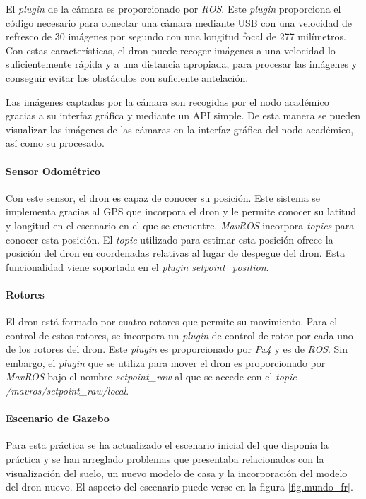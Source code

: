 El \textit{plugin} de la cámara es proporcionado por \textit{ROS}. Este \textit{plugin} proporciona el código necesario para conectar una cámara mediante USB con una velocidad de refresco de 30 imágenes por segundo  con una longitud focal de 277 milímetros. Con estas características, el dron puede recoger imágenes a una velocidad lo suficientemente rápida y a una distancia apropiada, para procesar las imágenes y conseguir evitar los obstáculos con suficiente antelación.

Las imágenes captadas por la cámara son recogidas por el nodo académico gracias a su interfaz gráfica y mediante un API simple. De esta manera se pueden visualizar las imágenes de las cámaras en la interfaz gráfica del nodo académico, así como su procesado.

\paragraph{Sensor Odométrico}
Con este sensor, el dron es capaz de conocer su posición. Este sistema se implementa gracias al GPS que incorpora el dron y le permite conocer su latitud y longitud en el escenario en el que se encuentre. \textit{MavROS} incorpora \textit{topics} para conocer esta posición. El \textit{topic} utilizado para estimar esta posición ofrece la posición del dron en coordenadas relativas al lugar de despegue del dron. Esta funcionalidad viene soportada en el \textit{plugin setpoint\_position}.

\paragraph{Rotores}
El dron está formado por cuatro rotores que permite su movimiento. Para el control de estos rotores, se incorpora un \textit{plugin} de control de rotor por cada uno de los rotores del dron. Este \textit{plugin} es proporcionado por \textit{Px4} y es de \textit{ROS}. Sin embargo, el \textit{plugin} que se utiliza para mover el dron es proporcionado por \textit{MavROS} bajo el nombre \textit{setpoint\_raw} al que se accede con el \textit{topic /mavros/setpoint\_raw/local}. 

\paragraph{Escenario de Gazebo}
Para esta práctica se ha actualizado el escenario inicial del que disponía la práctica y se han arreglado problemas que presentaba relacionados con la visualización del suelo, un nuevo modelo de casa y la incorporación del modelo del dron nuevo. El aspecto del escenario puede verse en la figura \ref{fig.mundo_fr}.

